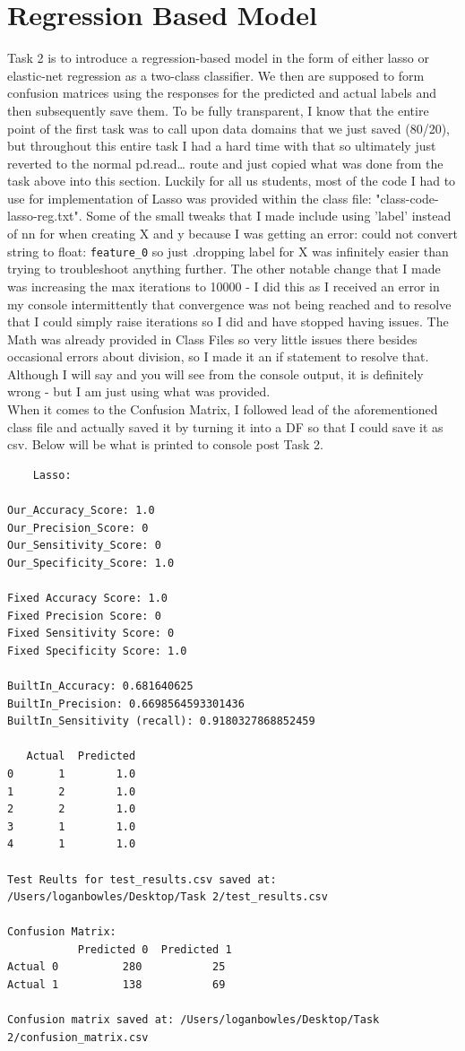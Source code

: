 \documentclass[conference]{IEEEtran} %
\begin{document}
\section{Regression Based Model}

Task 2 is to introduce a regression-based model in the form of either lasso or elastic-net regression as a two-class classifier.  We then are supposed to form confusion matrices using the responses for the predicted and actual labels and then subsequently save them.  To be fully transparent, I know that the entire point of the first task was to call upon data domains that we just saved (80/20), but throughout this entire task I had a hard time with that so ultimately just reverted to the normal pd.read… route and just copied what was done from the task above into this section.  Luckily for all us students, most of the code I had to use for implementation of Lasso was provided within the class file: "class-code-lasso-reg.txt".  Some of the small tweaks that I made include using 'label' instead of nn for when creating X and y because I was getting an error: could not convert string to float: \texttt{feature\_0} so just .dropping label for X was infinitely easier than trying to troubleshoot anything further.  The other notable change that I made was increasing the max iterations to 10000 - I did this as I received an error in my console intermittently that convergence was not being reached and to resolve that I could simply raise iterations so I did and have stopped having issues.  The Math was already provided in Class Files so very little issues there besides occasional errors about division, so I made it an if statement to resolve that.  Although I will say and you will see from the console output, it is definitely wrong - but I am just using what was provided. \\ When it comes to the Confusion Matrix, I followed lead of the aforementioned class file and actually saved it by turning it into a DF so that I could save it as csv.  Below will be what is printed to console post Task 2.

\begin{lstlisting}
    Lasso: 

Our_Accuracy_Score: 1.0
Our_Precision_Score: 0
Our_Sensitivity_Score: 0
Our_Specificity_Score: 1.0 

Fixed Accuracy Score: 1.0
Fixed Precision Score: 0
Fixed Sensitivity Score: 0
Fixed Specificity Score: 1.0 

BuiltIn_Accuracy: 0.681640625
BuiltIn_Precision: 0.6698564593301436
BuiltIn_Sensitivity (recall): 0.9180327868852459 

   Actual  Predicted
0       1        1.0
1       2        1.0
2       2        1.0
3       1        1.0
4       1        1.0 

Test Reults for test_results.csv saved at: /Users/loganbowles/Desktop/Task 2/test_results.csv

Confusion Matrix:
           Predicted 0  Predicted 1
Actual 0          280           25
Actual 1          138           69 

Confusion matrix saved at: /Users/loganbowles/Desktop/Task 2/confusion_matrix.csv 
\end{lstlisting}
\end{document}
